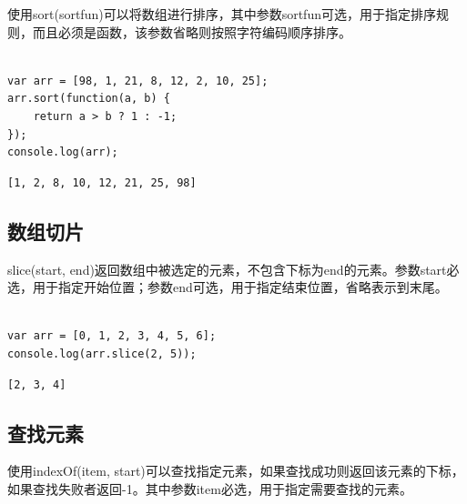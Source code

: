 使用sort(sortfun)可以将数组进行排序，其中参数sortfun可选，用于指定排序规则，而且必须是函数，该参数省略则按照字符编码顺序排序。\\

\\

\begin{lstlisting}[style=htmlcssjs]
var arr = [98, 1, 21, 8, 12, 2, 10, 25];
arr.sort(function(a, b) {
    return a > b ? 1 : -1;
});
console.log(arr);
\end{lstlisting}

\begin{tcolorbox}
	\begin{verbatim}
[1, 2, 8, 10, 12, 21, 25, 98]
	\end{verbatim}
\end{tcolorbox}

\vspace{0.5cm}

\subsection{数组切片}

slice(start, end)返回数组中被选定的元素，不包含下标为end的元素。参数start必选，用于指定开始位置；参数end可选，用于指定结束位置，省略表示到末尾。\\

\\

\begin{lstlisting}[style=htmlcssjs]
var arr = [0, 1, 2, 3, 4, 5, 6];
console.log(arr.slice(2, 5));
\end{lstlisting}

\begin{tcolorbox}
	\begin{verbatim}
[2, 3, 4]
	\end{verbatim}
\end{tcolorbox}

\vspace{0.5cm}

\subsection{查找元素}

使用indexOf(item, start)可以查找指定元素，如果查找成功则返回该元素的下标，如果查找失败者返回-1。其中参数item必选，用于指定需要查找的元素。\\

